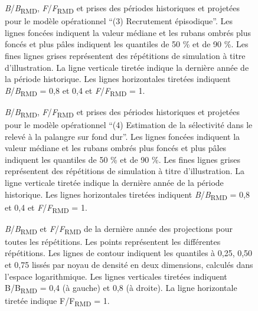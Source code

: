 \documentclass[11pt]{book}
\begin{document}
\begin{figure}[htb]

{\centering {} 

}

\caption{\emph{B}/\emph{B}\textsubscript{RMD}, \emph{F}/\emph{F}\textsubscript{RMD} et prises des périodes historiques et projetées pour le modèle opérationnel ``(3) Recrutement épisodique''. Les lignes foncées indiquent la valeur médiane et les rubans ombrés plus foncés et plus pâles indiquent les quantiles de 50 \% et de 90 \%. Les fines lignes grises représentent des répétitions de simulation à titre d'illustration. La ligne verticale tiretée indique la dernière année de la période historique. Les lignes horizontales tiretées indiquent \emph{B}/\emph{B}\textsubscript{RMD} = 0,8 et 0,4 et \emph{F}/\emph{F}\textsubscript{RMD} = 1.}\label{fig:proj-episodic-recruitment}
\end{figure}

\begin{figure}[htb]

{\centering {} 

}

\caption{\emph{B}/\emph{B}\textsubscript{RMD}, \emph{F}/\emph{F}\textsubscript{RMD} et prises des périodes historiques et projetées pour le modèle opérationnel ``(4) Estimation de la sélectivité dans le relevé à la palangre sur fond dur''. Les lignes foncées indiquent la valeur médiane et les rubans ombrés plus foncés et plus pâles indiquent les quantiles de 50 \% et de 90 \%. Les fines lignes grises représentent des répétitions de simulation à titre d'illustration. La ligne verticale tiretée indique la dernière année de la période historique. Les lignes horizontales tiretées indiquent \emph{B}/\emph{B}\textsubscript{RMD} = 0,8 et 0,4 et \emph{F}/\emph{F}\textsubscript{RMD} = 1.}\label{fig:proj-upweight-dogfish}
\end{figure}
\clearpage


\begin{figure}[htb]

{\centering {} 

}

\caption{\emph{B}/\emph{B}\textsubscript{RMD} et \emph{F}/\emph{F}\textsubscript{RMD} de la dernière année des projections pour toutes les répétitions. Les points représentent les différentes répétitions. Les lignes de contour indiquent les quantiles à 0,25, 0,50 et 0,75 lissés par noyau de densité en deux dimensions, calculés dans l'espace logarithmique. Les lignes verticales tiretées indiquent B/B\textsubscript{RMD} = 0,4 (à gauche) et 0,8 (à droite). La ligne horizontale tiretée indique F/F\textsubscript{RMD} = 1.}\label{fig:kobe}
\end{figure}
\clearpage
\end{document}
